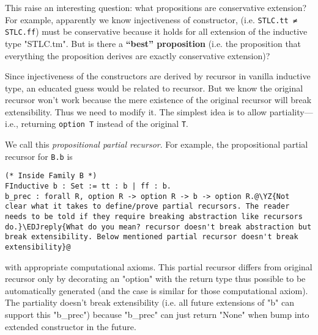 This raise an interesting question: what propositions are conservative extension? For example, apparently we know injectiveness of constructor, (i.e. \texttt{STLC.tt ≠ STLC.ff}) must be conservative because it holds for all extension of the inductive type "STLC.tm". But is there a \textbf{``best'' proposition} (i.e. the proposition that everything the proposition derives are exactly conservative extension)?

Since injectiveness of the constructors are derived by recursor in vanilla inductive type, an educated guess would be related to recursor. But we know the original recursor won't work because the mere existence of the original recursor will break extensibility. Thus we need to modify it.
The simplest idea is to allow partiality---i.e., returning
\texttt{option T} instead of the original \texttt{T}.

We call this \textit{propositional partial recursor}.
For example, the propositional partial recursor for \texttt{B.b} is

\begin{verbatim}
(* Inside Family B *)
FInductive b : Set := tt : b | ff : b.
b_prec : forall R, option R -> option R -> b -> option R.@\YZ{Not clear what it takes to define/prove partial recursors. The reader needs to be told if they require breaking abstraction like recursors do.}\EDJreply{What do you mean? recursor doesn't break abstraction but break extensibility. Below mentioned partial recursor doesn't break extensibility}@
\end{verbatim}
with appropriate computational axioms. This partial recursor differs from original recursor only by decorating an "option" with the return type thus possible to be automatically generated (and the case is similar for those computational axiom). The partiality doesn't break
extensibility (i.e. all future extensions of "b" can support this
"b_prec") because "b_prec" can just return "None" when bump into extended constructor in the future. 

